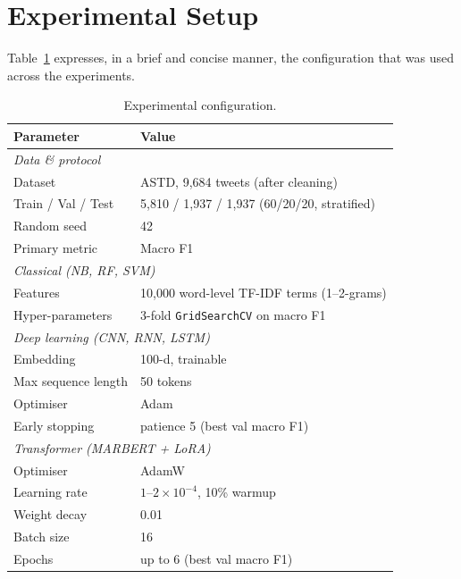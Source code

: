 \documentclass[conference]{IEEEtran}
\begin{document}
\section{Experimental Setup}

Table~\ref{tab:setup} expresses, in a brief and concise manner, the configuration that
was used across the experiments.

\begin{table}[t]
  \centering
  \caption{Experimental configuration.}
  \label{tab:setup}
  \setlength{\tabcolsep}{5pt}
  \begin{tabular}{ll}
    \toprule
    \textbf{Parameter} & \textbf{Value} \\
    \midrule
    \multicolumn{2}{l}{\textit{Data \& protocol}}\\
    Dataset             & ASTD, 9{,}684 tweets (after cleaning) \\
    Train / Val / Test  & 5{,}810 / 1{,}937 / 1{,}937 (60/20/20, stratified) \\
    Random seed         & 42 \\
    Primary metric      & Macro F1 \\
    \midrule
    \multicolumn{2}{l}{\textit{Classical (NB, RF, SVM)}}\\
    Features            & 10{,}000 word-level TF-IDF terms (1--2-grams) \\
    Hyper-parameters    & 3-fold \texttt{GridSearchCV} on macro F1 \\
    \midrule
    \multicolumn{2}{l}{\textit{Deep learning (CNN, RNN, LSTM)}}\\
    Embedding           & 100-d, trainable \\
    Max sequence length & 50 tokens \\
    Optimiser           & Adam \\
    Early stopping      & patience 5 (best val macro F1) \\
    \midrule
    \multicolumn{2}{l}{\textit{Transformer (MARBERT + LoRA)}}\\
    Optimiser           & AdamW \\
    Learning rate       & $1$--$2\times10^{-4}$, 10\% warmup \\
    Weight decay        & 0.01 \\
    Batch size          & 16 \\
    Epochs              & up to 6 (best val macro F1) \\

\end{tabular}
\end{table}
\end{document}
